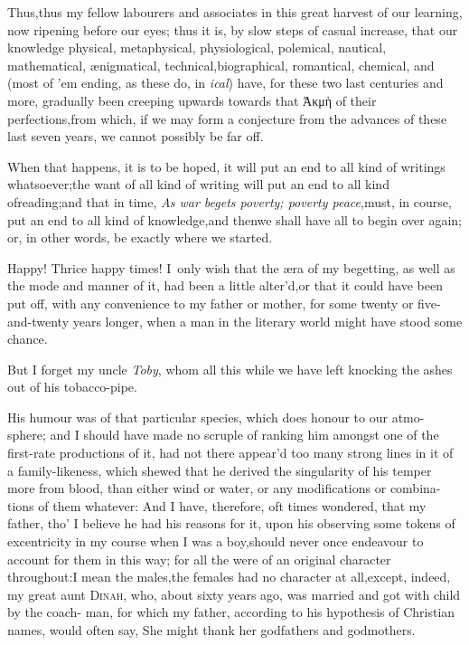 \documentclass{article}
\begin{document}
Thus,\tsk thus my fellow labourers and associates in this great harvest of
our learning, now ripening before our eyes; thus it is, by slow steps of casual
increase, that our knowledge physical, metaphysical, physiological, polemical,
nautical, mathematical, ænigmatical, technical,\break biographical, romantical,
chemical, and 
\break
(most of ’em ending, as these do, in \textit{ical}) 
have, for these two last centuries and more, gradually been creeping upwards towards that Ἀκμὴ of their
perfections,\break from which, if we may form a conjecture from the advances of these last
seven years, we cannot possibly be far off.

When that happens, it is to be hoped, it will put an end to all
kind of writings whatsoever;\tsk the want of all kind of writing
will put an end to all kind of\break reading;\tsk and that in time,
\textit{As war be\-gets poverty; poverty peace},\tsh must, in
course, put an end to all kind of know\-ledge,\tsk and
then\tsh we shall have all to begin over again; or, in
other words, be exactly where we started.

\tsh Happy! Thrice happy times! I~only wish that the æra of my begetting, as well
as the mode and manner of it, had been a little alter’d,\tsk or that it could have
been put off, with any convenience to my father or mother, for some twenty or
five-and-twenty years longer, when a man in the literary world might have\break
stood some chance.\tsh 

But I forget my uncle \textit{Toby}, whom all this while we have
left knocking the ashes out of his tobacco-pipe.

His humour was of that particular\break
species, which does honour to our atmo-
sphere; and I should have made no scruple of ranking him
amongst one of the first-rate productions of it, had not there
appear’d too many strong lines in it of a family-likeness, which
shewed that he derived the singularity of his temper\break
more from blood, than either wind or\break 
water, or any modifications or combina-\break
tions of them whatever: And I have, therefore, oft times
wondered, that my father, tho’ I believe he had his reasons
for it, upon his observing some tokens of excentricity in my
course when I was a boy,\tsk should never once endeavour to
account for them in this way; for all the\break
{} were of an original character
throughout:\tsh I mean the males,\tsk the females had no
character at all,\tsk except, indeed, my great aunt
\textsc{Dinah}, who, about sixty years ago, was married and got with child by the
coach- man,
for which my father, according to his hypothesis of Christian
names, would often say, She might thank her godfathers and
godmothers.
\end{document}
